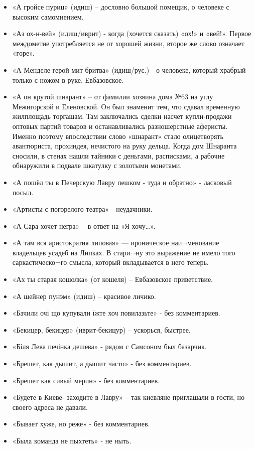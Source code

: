 \begin{itemize}
\item  «А гройсе пуриц» (идиш) – дословно большой помещик, о человеке с высоким самомнением.
\item  «Аз ох-н-вей» (идиш/иврит) - когда (хочется сказать) «ох!» и «вей!». Первое междометие употребляется не от хорошей жизни, второе же слово означает «горе». 
\item  «А Менделе герой мит бритва» (идиш/рус.) - о человеке, который храбрый только с ножом в руке. Евбазовское.
\item  «А он крутой шнарант» – от фамилии хозяина дома №63 на углу Межигорской и Еленовской. Он был знаменит тем, что сдавал временную жилплощадь торгашам. Там заключались сделки насчет купли-продажи оптовых партий товаров и останавливались разношерстные аферисты. Именно поэтому впоследствии слово «шнарант» стало олицетворять авантюриста, прохиндея, нечистого на руку дельца. Когда дом Шнаранта сносили, в стенах нашли тайники с деньгами, расписками, а рабочие обнаружили в подвале шкатулку с золотыми монетами.
\item  «А пошёл ты в Печерскую Лавру пешком - туда и обратно» - ласковый посыл.
\item  «Артисты с погорелого театра» - неудачники.
\item  «А Сара хочет негра» – в ответ на «Я хочу…».
\item  «А там вся аристократия липовая» — ироническое наи¬менование владельцев усадеб на Липках. В стари¬ну это выражение не имело того саркастическо¬го смысла, который вкладывается в него теперь.
\item  «Ах ты старая кошолка» (от кошеля) – Евбазовское приветствие.
\item  «А шейнер пунэм» (идиш) – красивое личико.
\item  «Бачили очі що купували їжте хоч повилазьте» - без комментариев.
\item  «Бекицер, бекицер» (иврит-бекицур) – ускорься, быстрее.
\item  «Біля Лева печінка дешева» - рядом с Самсоном был базарчик.
\item  «Брешет, как дышит, а дышит часто» - без комментариев.
\item  «Брешет как сивый мерин» - без комментариев.
\item  «Будете в Киеве- заходите в Лавру» – так киевляне приглашали в гости, но своего адреса не давали.
\item  «Бывает хуже, но реже» - без комментариев.
\item  «Была команда не пыхтеть» - не ныть.

\end{itemize}
